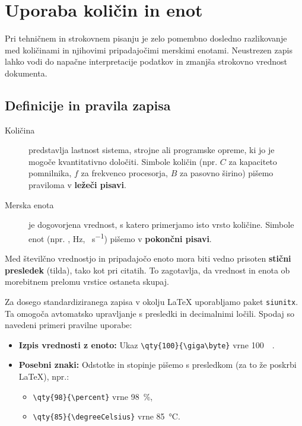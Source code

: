 \documentclass[a4paper,12pt,openright]{book}
\begin{document}
\section{Uporaba količin in enot}

Pri tehničnem in strokovnem pisanju je zelo pomembno dosledno razlikovanje med količinami in njihovimi pripadajočimi merskimi enotami. Neustrezen zapis lahko vodi do napačne interpretacije podatkov in zmanjša strokovno vrednost dokumenta.

\subsection{Definicije in pravila zapisa}

\begin{description}
    \item[Količina] predstavlja lastnost sistema, strojne ali programske opreme, ki jo je mogoče kvantitativno določiti. Simbole količin (npr. $C$ za kapaciteto pomnilnika, $f$ za frekvenco procesorja, $B$ za pasovno širino) pišemo praviloma v \textbf{ležeči pisavi}.
    \item[Merska enota] je dogovorjena vrednost, s katero primerjamo isto vrsto količine. Simbole enot (npr. \unit{\byte}, \unit{\hertz}, \unit{\bit\per\second}) pišemo v \textbf{pokončni pisavi}.
\end{description}

Med številčno vrednostjo in pripadajočo enoto mora biti vedno prisoten \textbf{stični presledek} (tilda), tako kot pri citatih. To zagotavlja, da vrednost in enota ob morebitnem prelomu vrstice ostaneta skupaj.

Za dosego standardiziranega zapisa v okolju \LaTeX{} uporabljamo paket \texttt{siunitx}. Ta omogoča avtomatsko upravljanje s presledki in decimalnimi ločili. Spodaj so navedeni primeri pravilne uporabe:

\begin{itemize}
    \item \textbf{Izpis vrednosti z enoto:} Ukaz \verb|\qty{100}{\giga\byte}| vrne \qty{100}{\giga\byte}.
    \item \textbf{Posebni znaki:} Odstotke in stopinje pišemo s presledkom (za to že poskrbi \LaTeX), npr.:
    \begin{itemize}
         \item\verb|\qty{98}{\percent}| vrne \qty{98}{\percent},
         \item\verb|\qty{85}{\degreeCelsius}| vrne \qty{85}{\degreeCelsius}.
     \end{itemize}
\end{itemize}
\end{document}
